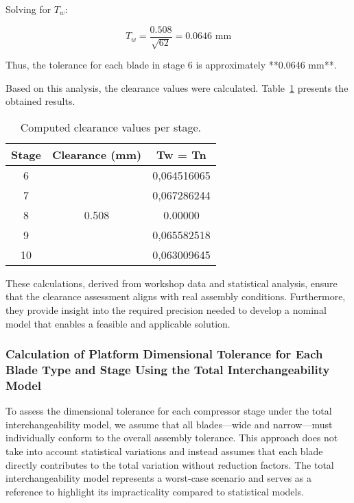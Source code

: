 Solving for \( T_w \):

\begin{equation}
    T_w = \frac{0.508}{\sqrt{62}} = 0.0646 \text{ mm}
\end{equation}

Thus, the tolerance for each blade in stage 6 is approximately **0.0646 mm**.

Based on this analysis, the clearance values were calculated. Table~\ref{tab:clearance} presents the obtained results.

\begin{table}[h]
    \centering
    \begin{tabular}{@{}ccc@{}}
        \toprule
        Stage & Clearance (mm) & Tw = Tn \\ 
        \midrule
        6  & & 0,064516065    \\ 
        7  &   & 0,067286244    \\ 
        8  & 0.508  & 0.00000 \\ 
        9  &   & 0,065582518    \\ 
        10 &   & 0,063009645    \\ 
        \bottomrule
    \end{tabular}
    \caption{Computed clearance values per stage.}
    \label{tab:clearance}
\end{table}

These calculations, derived from workshop data and statistical analysis, ensure that the clearance assessment aligns with real assembly conditions. Furthermore, they provide insight into the required precision needed to develop a nominal model that enables a feasible and applicable solution.

\subsubsection{Calculation of Platform Dimensional Tolerance for Each Blade Type and Stage Using the Total Interchangeability Model}
\label{subsubsec:clearance_calculation2}

To assess the dimensional tolerance for each compressor stage under the total interchangeability model, we assume that all blades—wide and narrow—must individually conform to the overall assembly tolerance. This approach does not take into account statistical variations and instead assumes that each blade directly contributes to the total variation without reduction factors. The total interchangeability model represents a worst-case scenario and serves as a reference to highlight its impracticality compared to statistical models.


